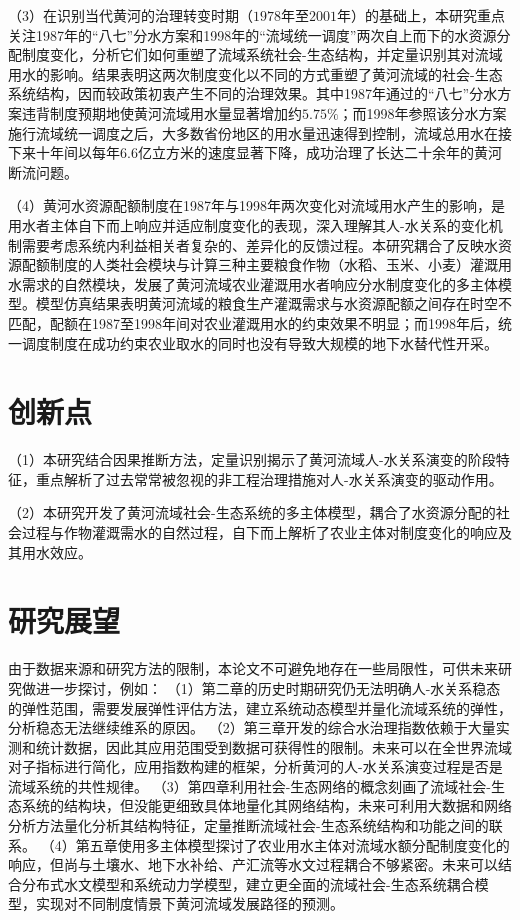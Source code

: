 （3）在识别当代黄河的治理转变时期（$1978$年至$2001$年）的基础上，本研究重点关注1987年的``八七''分水方案和1998年的“流域统一调度”两次自上而下的水资源分配制度变化，分析它们如何重塑了流域系统社会-生态结构，并定量识别其对流域用水的影响。结果表明这两次制度变化以不同的方式重塑了黄河流域的社会-生态系统结构，因而较政策初衷产生不同的治理效果。其中1987年通过的``八七''分水方案违背制度预期地使黄河流域用水量显著增加约$5.75\%$；而1998年参照该分水方案施行流域统一调度之后，大多数省份地区的用水量迅速得到控制，流域总用水在接下来十年间以每年$6.6$亿立方米的速度显著下降，成功治理了长达二十余年的黄河断流问题。

（4）黄河水资源配额制度在1987年与1998年两次变化对流域用水产生的影响，是用水者主体自下而上响应并适应制度变化的表现，深入理解其人-水关系的变化机制需要考虑系统内利益相关者复杂的、差异化的反馈过程。本研究耦合了反映水资源配额制度的人类社会模块与计算三种主要粮食作物（水稻、玉米、小麦）灌溉用水需求的自然模块，发展了黄河流域农业灌溉用水者响应分水制度变化的多主体模型。模型仿真结果表明黄河流域的粮食生产灌溉需求与水资源配额之间存在时空不匹配，配额在1987至1998年间对农业灌溉用水的约束效果不明显；而1998年后，统一调度制度在成功约束农业取水的同时也没有导致大规模的地下水替代性开采。

\section{创新点}

（1）本研究结合因果推断方法，定量识别揭示了黄河流域人-水关系演变的阶段特征，重点解析了过去常常被忽视的非工程治理措施对人-水关系演变的驱动作用。

（2）本研究开发了黄河流域社会-生态系统的多主体模型，耦合了水资源分配的社会过程与作物灌溉需水的自然过程，自下而上解析了农业主体对制度变化的响应及其用水效应。

\section{研究展望}

由于数据来源和研究方法的限制，本论文不可避免地存在一些局限性，可供未来研究做进一步探讨，例如：
（1）第二章的历史时期研究仍无法明确人-水关系稳态的弹性范围，需要发展弹性评估方法，建立系统动态模型并量化流域系统的弹性，分析稳态无法继续维系的原因。
（2）第三章开发的综合水治理指数依赖于大量实测和统计数据，因此其应用范围受到数据可获得性的限制。未来可以在全世界流域对子指标进行简化，应用指数构建的框架，分析黄河的人-水关系演变过程是否是流域系统的共性规律。
（3）第四章利用社会-生态网络的概念刻画了流域社会-生态系统的结构块，但没能更细致具体地量化其网络结构，未来可利用大数据和网络分析方法量化分析其结构特征，定量推断流域社会-生态系统结构和功能之间的联系。
（4）第五章使用多主体模型探讨了农业用水主体对流域水额分配制度变化的响应，但尚与土壤水、地下水补给、产汇流等水文过程耦合不够紧密。未来可以结合分布式水文模型和系统动力学模型，建立更全面的流域社会-生态系统耦合模型，实现对不同制度情景下黄河流域发展路径的预测。

